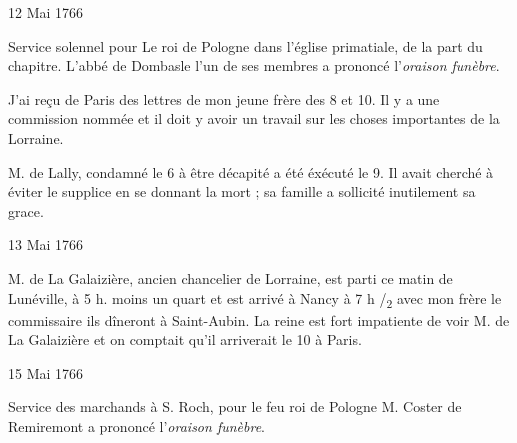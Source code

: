                      \begin{diary}{12 Mai 1766}{}

                         Service solennel pour Le roi de Pologne
                           dans l’église
                              primatiale, de la part du chapitre.
                           L'abbé de Dombasle l'un de
                           ses membres
                           a prononcé l'\emph{oraison
                              funèbre}. \bigskip


                         J'ai reçu de Paris des lettres de mon jeune
                              frère des 8 et
                              10. Il y a une commission
                           nommée et il doit y avoir un travail
                           sur les choses importantes de la Lorraine. \bigskip



                           M. de Lally, condamné le 6 à être
                           décapité a été éxécuté le 9. Il
                           avait
                           cherché à éviter le supplice en se donnant la
                           mort ; sa famille a sollicité inutilement
                           sa grace. \bigskip


                     \end{diary}
                     \begin{diary}{13 Mai 1766}{}


                           M. de La Galaizière, ancien
                           chancelier de
                           Lorraine, est parti ce matin
                           de Lunéville, à 5 h. moins un quart et est arrivé à
                           Nancy à 7 h /\textsubscript{2} avec mon frère le commissaire
                           ils dîneront à Saint-Aubin. La
                              reine est fort
                           impatiente de voir M. de La Galaizière et on comptait
                           qu'il arriverait le 10 à
                              Paris. \bigskip


                     \end{diary}

                     \begin{diary}{15 Mai 1766}{}

                         Service des marchands à S. Roch, pour le feu
                              roi de Pologne
                           M. Coster de Remiremont a prononcé
                           l'\emph{oraison funèbre}. \bigskip


                     \end{diary}

